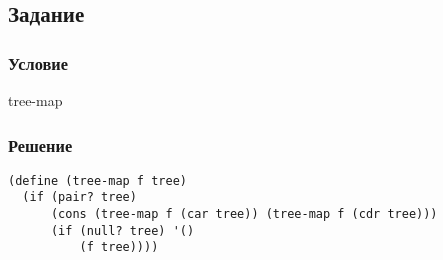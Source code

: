 \documentclass[10pt,a4paper]{article}
\begin{document}
\subsection*{Задание}
\subsubsection*{Условие}
tree-map
\subsubsection*{Решение}
\begin{lstlisting}
(define (tree-map f tree)
  (if (pair? tree)
      (cons (tree-map f (car tree)) (tree-map f (cdr tree)))
      (if (null? tree) '()
          (f tree))))
\end{lstlisting}
\end{document}
